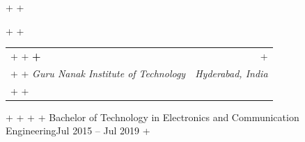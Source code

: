 \documentclass[letterpaper,10pt]{article}                                                                                                                                                                                                                                                                                                                                                                                                                                                                                                                                                                         +
\makeatletter
\newcommand{\resumeSubheading}[4]{                                                                                                                                                                                                                                                                                                                                                                                                                                                                                                                                                                                +
                                                                                                                                                                                                                                                                                                                                                                                                                                                                                                                                                                                                                   +
   \vspace{-2pt}\item                                                                                                                                                                                                                                                                                                                                                                                                                                                                                                                                                                                              +
                                                                                                                                                                                                                                                                                                                                                                                                                                                                                                                                                                                                                   +
     \begin{tabular*}{0.97\textwidth}[t]{l@{\extracolsep{\fill}}r}                                                                                                                                                                                                                                                                                                                                                                                                                                                                                                                                                 +
                                                                                                                                                                                                                                                                                                                                                                                                                                                                                                                                                                                                                   +
       \textbf{#1} & #2 \\                                                                                                                                                                                                                                                                                                                                                                                                                                                                                                                                                                                         +
                                                                                                                                                                                                                                                                                                                                                                                                                                                                                                                                                                                                                   +
       \textit{\small#3} & \textit{\small #4} \\                                                                                                                                                                                                                                                                                                                                                                                                                                                                                                                                                                   +
                                                                                                                                                                                                                                                                                                                                                                                                                                                                                                                                                                                                                   +
     \end{tabular*}\vspace{-6pt}                                                                                                                                                                                                                                                                                                                                                                                                                                                                                                                                                                                   +
                                                                                                                                                                                                                                                                                                                                                                                                                                                                                                                                                                                                                   +
 }                                                                                                                                                                                                                                                                                                                                                                                                                                                                                                                                                                                                                 +
\makeatother
\begin{document}
   \resumeSubheading                                                                                                                                                                                                                                                                                                                                                                                                                                                                                                                                                                                               +
                                                                                                                                                                                                                                                                                                                                                                                                                                                                                                                                                                                                                   +
     {Guru Nanak Institute of Technology}{Hyderabad, India}                                                                                                                                                                                                                                                                                                                                                                                                                                                                                                                                                        +
                                                                                                                                                                                                                                                                                                                                                                                                                                                                                                                                                                                                                   +
     {Bachelor of Technology in Electronics and Communication Engineering}{Jul 2015 -- Jul 2019}                                                                                                                                                                                                                                                                                                                                                                                                                                                                                                                   +
\end{document}
